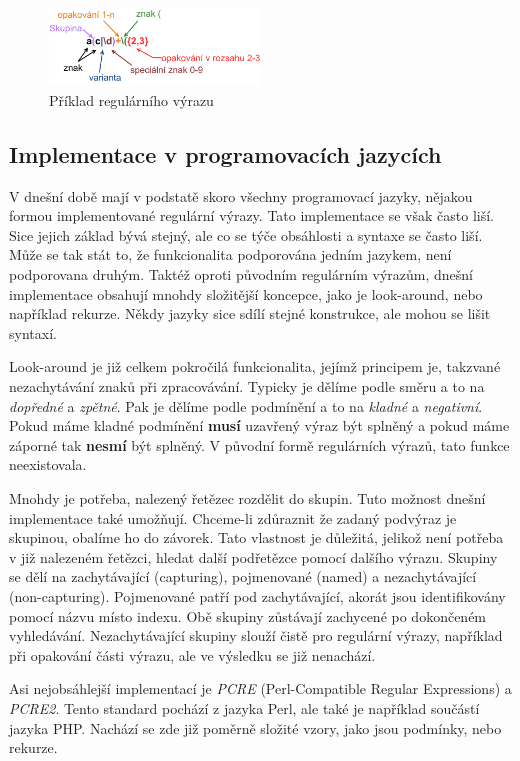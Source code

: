 \begin{figure}[!h]
	\centering
	\includegraphics[width=0.5\textwidth]{Figures/regex_exmp.pdf}
	\caption{Příklad regulárního výrazu}
	\label{fig:REGEXEXMP}
\end{figure}

\subsection*{Implementace v programovacích jazycích}\label{sec:impipl}

V dnešní době mají v podstatě skoro všechny programovací jazyky, nějakou formou implementované regulární výrazy.
Tato implementace se však často liší. 
Sice jejich základ bývá stejný, ale co se týče obsáhlosti a syntaxe se často liší.
Může se tak stát to, že funkcionalita podporována jedním jazykem, není podporovana druhým.
Taktéž oproti původním regulárním výrazům, dnešní implementace obsahují mnohdy složitější koncepce, jako je look-around, nebo například rekurze.
Někdy jazyky sice sdílí stejné konstrukce, ale mohou se lišit syntaxí.

Look-around je již celkem pokročilá funkcionalita, jejímž principem je, takzvané nezachytávání znaků při zpracovávání.
Typicky je dělíme podle směru a to na \textit{dopředné} a \textit{zpětné}.
Pak je dělíme podle podmínění a to na \textit{kladné} a \textit{negativní}.
Pokud máme kladné podmínění \textbf{musí} uzavřený výraz být splněný a pokud máme záporné tak \textbf{nesmí} být splněný.
V původní formě regulárních výrazů, tato funkce neexistovala.

Mnohdy je potřeba, nalezený řetězec rozdělit do skupin. 
Tuto možnost dnešní implementace také umožňují.
Chceme-li zdůraznit že zadaný podvýraz je skupinou, obalíme ho do závorek.
Tato vlastnost je důležitá, jelikož není potřeba v již nalezeném řetězci, hledat další podřetězce pomocí dalšího výrazu.
Skupiny se dělí na zachytávající (capturing), pojmenované (named) a nezachytávající (non-capturing).
Pojmenované patří pod zachytávající, akorát jsou identifikovány pomocí názvu místo indexu.
Obě skupiny zůstávají zachycené po dokončeném vyhledávání.
Nezachytávající skupiny slouží čistě pro regulární výrazy, například při opakování části výrazu, ale ve výsledku se již nenachází.

Asi nejobsáhlejší implementací je \textit{PCRE} (Perl-Compatible Regular Expressions) a \textit{PCRE2}.
Tento standard pochází z jazyka Perl, ale také je například součástí jazyka PHP.
Nachází se zde již poměrně složité vzory, jako jsou podmínky, nebo rekurze.

\endinput

